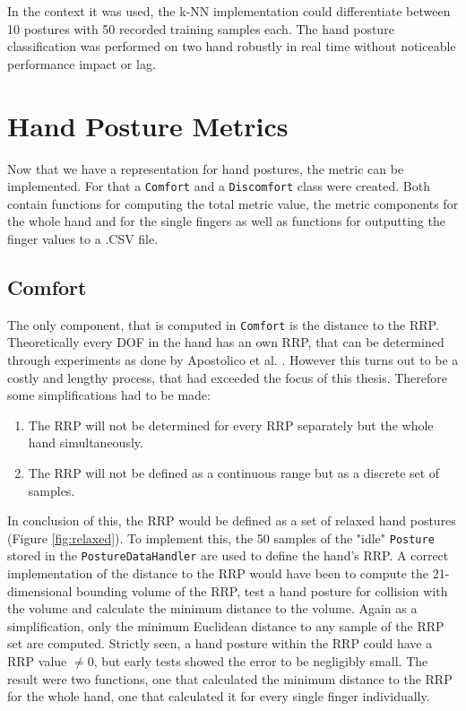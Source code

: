 In the context it was used, the k-NN implementation could differentiate between 10 postures with 50 recorded training samples each. The hand posture classification was performed on two hand robustly in real time without noticeable performance impact or lag. 


\section{Hand Posture Metrics}\label{chapter:handosturemetric}

Now that we have a representation for hand postures, the metric can be implemented. For that a \texttt{Comfort} and a \texttt{Discomfort} class were created. Both contain functions for computing the total metric value, the metric components for the whole hand and for the single fingers as well as functions for outputting the finger values to a .CSV file. 

\subsection{Comfort}

The only component, that is computed in \texttt{Comfort} is the distance to the RRP. Theoretically every DOF in the hand has an own RRP, that can be determined through experiments as done by Apostolico et al. \cite{apostolico2014postural}. However this turns out to be a costly and lengthy process, that had exceeded the focus of this thesis. Therefore some simplifications had to be made:

\begin{enumerate}
	\item The RRP will not be determined for every RRP separately but the whole hand simultaneously.
	\item The RRP will not be defined as a continuous range but as a discrete set of samples.
\end{enumerate}

In conclusion of this, the RRP would be defined as a set of relaxed hand postures (Figure \ref{fig:relaxed}). To implement this, the 50 samples of the "idle" \texttt{Posture} stored in the \texttt{PostureDataHandler} are used to define the hand's RRP. A correct implementation of the distance to the RRP would have been to compute the 21-dimensional bounding volume of the RRP, test a hand posture for collision with the volume and calculate the minimum distance to the volume. Again as a simplification, only the minimum Euclidean distance to any sample of the RRP set are computed. Strictly seen, a hand posture within the RRP could have a RRP value \begin{math}\not= 0\end{math}, 
but early tests showed the error to be negligibly small.
The result were two functions, one that calculated the minimum distance to the RRP for the whole hand, one that calculated it for every single finger individually.

